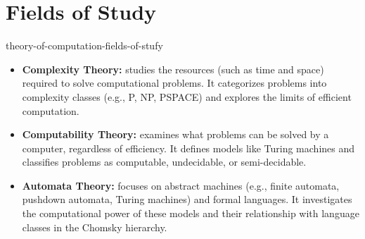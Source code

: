 \documentclass[preview]{standalone}
\begin{document}
\genpage

\section{Fields of Study}

\begin{snippet}{theory-of-computation-fields-of-stufy}
    \vspace{-0.25cm}
    \begin{itemize}
        \item \textbf{Complexity Theory:} studies the resources (such as time and space) required to solve computational problems. It categorizes problems into complexity classes (e.g., P, NP, PSPACE) and explores the limits of efficient computation.
        \item \textbf{Computability Theory:} examines what problems can be solved by a computer, regardless of efficiency. It defines models like Turing machines and classifies problems as computable, undecidable, or semi-decidable.
        \item \textbf{Automata Theory:} focuses on abstract machines (e.g., finite automata, pushdown automata, Turing machines) and formal languages. It investigates the computational power of these models and their relationship with language classes in the Chomsky hierarchy.
    \end{itemize}
\end{snippet}
\end{document}
